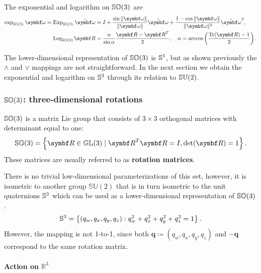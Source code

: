 \begin{important}
  The exponential and logarithm on ${\mathbb{SO}(3)}$ are
  \begin{subequations}
    \begin{align}
      \exp_\SOthree \bomega = \Exp_\SOthree \hat {\bomega} & = I + \frac{\sin \| \bomega \|}{\|\bomega \|} \hat {\bomega} + \frac{1 - \cos \| \bomega \|}{\| \bomega \|^2} \hat {\bomega}^2, \\
      \Log_\SOthree \bR                                    & = \frac{\alpha}{\sin \alpha} \frac{\bR - \bR^T}{2}, \quad \alpha = \arccos \left( \frac{\tr(\bR) - 1}{2} \right).
    \end{align}
  \end{subequations}
\end{important}
The lower-dimensional representation of ${\mathbb{SO}(3)}$ is ${\mathbb{S}^3}$, but as shown previously the $\wedge$ and $\vee$ mappings are not straightforward. In the next section we obtain the exponential and logarithm on ${\mathbb{S}^3}$ through its relation to ${\mathbb{SU}(2)}$.

\subsubsection{${\mathbb{SO}(3)}$: three-dimensional rotations}

${\mathbb{SO}(3)}$ is a matrix Lie group that consists of $3 \times 3$ orthogonal matrices with determinant equal to one:
\begin{equation}
  \SOthree = \left\{ \bR \in \mathbb{GL}(3) \mid \bR^T \bR = I, \det(\bR) = 1  \right\}.
\end{equation}
These matrices are usually referred to as \textbf{rotation matrices}.

There is no trivial low-dimensional parameterizations of this set, however, it is isometric to another group $\mathbb{SU}(2)$ that is in turn isometric to the unit quaternions ${\mathbb{S}^3}$ which can be used as a lower-dimensional representation of ${\mathbb{SO}(3)}$.
\begin{equation}
  {\mathbb{S}^3} = \left \{ (q_w, q_x, q_y, q_z)  : q_w^2 + q_x^2 + q_y^2 + q_z^2 = 1 \right\}.
\end{equation}
However, the mapping is not 1-to-1, since both $\symbf{q} \coloneq (q_w, q_x, q_y, q_z)$ and $-\symbf{q}$ correspond to the same rotation matrix.


\paragraph{Action on $\mathbb{R}^3$}

